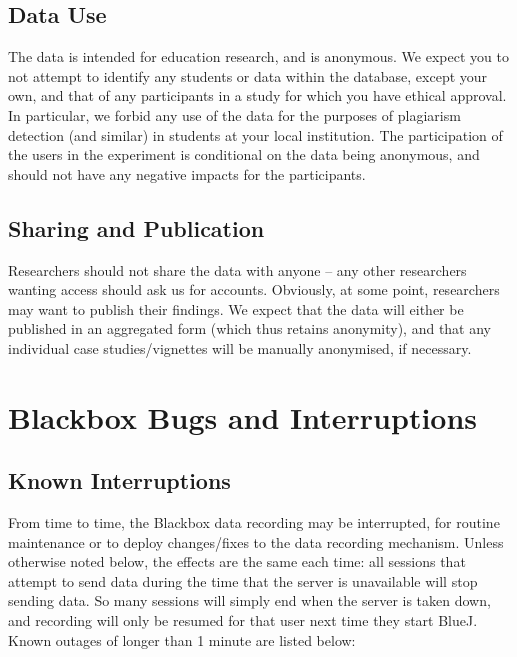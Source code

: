 \documentclass{report}
\begin{document}
\section{Data Use}

The data is intended for education research, and is anonymous.  We expect you
to not attempt to identify any students or data within the database, except
your own, and that of any participants in a study for which you have ethical
approval.  In particular, we forbid any use of the data for the purposes of
plagiarism detection (and similar) in students at your local institution.  The
participation of the users in the experiment is conditional on the data being
anonymous, and should not have any negative impacts for the participants.

\section{Sharing and Publication}

Researchers should not share the data with anyone -- any other researchers
wanting access should ask us for accounts.  Obviously, at some point,
researchers may want to publish their findings.  We expect that the data will
either be published in an aggregated form (which thus retains anonymity), and
that any individual case studies/vignettes will be manually anonymised, if
necessary.

\chapter{Blackbox Bugs and Interruptions}

\section{Known Interruptions}

From time to time, the Blackbox data recording may be interrupted, for routine maintenance or to deploy changes/fixes to the data recording mechanism.
Unless otherwise noted below, the effects are the same each time: all sessions that attempt to send data during the time that the server is unavailable will stop sending data.  So many sessions will simply end when the server is taken down, and recording will only be resumed for that user next time they start BlueJ.  Known outages of longer than 1 minute are listed below:
\end{document}
